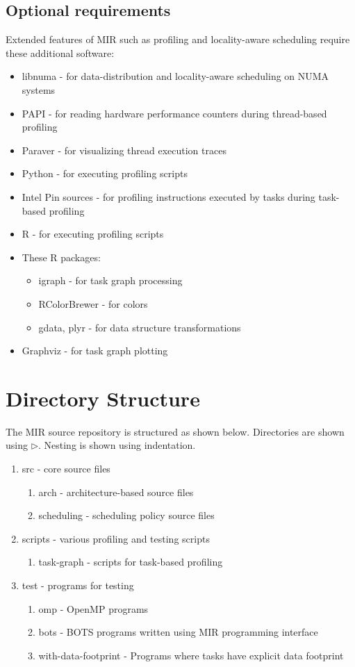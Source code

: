 \documentclass[11pt,a4paper,notitlepage]{article}
\begin{document}
\subsection{Optional requirements}
Extended features of MIR such as profiling and locality-aware scheduling require these additional software:
\begin{itemize}
\item libnuma - for data-distribution and locality-aware scheduling on NUMA systems
\item PAPI - for reading hardware performance counters during thread-based profiling
\item Paraver - for visualizing thread execution traces
\item Python - for executing profiling scripts
\item Intel Pin sources - for profiling instructions executed by tasks during task-based profiling
\item R - for executing profiling scripts
\item These R packages: 
\begin{itemize}
\item igraph - for task graph processing
\item RColorBrewer - for colors
\item gdata, plyr - for data structure transformations
\end{itemize}
\item Graphviz - for task graph plotting
\end{itemize}

\section{Directory Structure}
The MIR source repository is structured as shown below. Directories are shown using $\triangleright$. Nesting is shown using indentation.
\begin{enumerate}[$\triangleright$]
\item src - core source files
    \begin{enumerate}[$\triangleright$]
        \item arch - architecture-based source files
        \item scheduling - scheduling policy source files
    \end{enumerate}
\item scripts - various profiling and testing scripts
    \begin{enumerate}[$\triangleright$]
        \item task-graph - scripts for task-based profiling
    \end{enumerate}
\item test - programs for testing 
    \begin{enumerate}[$\triangleright$]
        \item omp - OpenMP programs
        \item bots - BOTS programs written using MIR programming interface
        \item with-data-footprint - Programs where tasks have explicit data footprint 
    \end{enumerate}
\end{enumerate}
\end{document}

